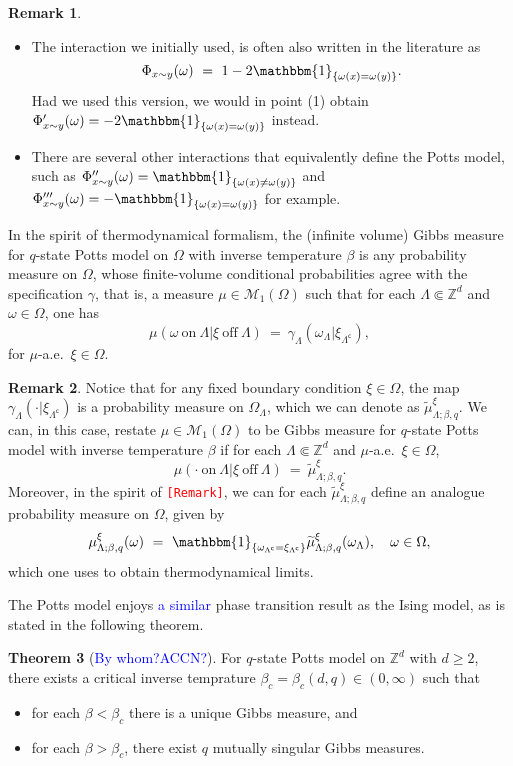 \documentclass[12pt]{article}
\newcommand{\M}{\mathcal{M}}
\newcommand{\Z}{\mathbb{Z}}
\newcommand{\set}[1]{\left\{#1\right\}}
\newcommand{\pika}{\boldsymbol{\cdot}}
\newcommand{\1}{\mathbbm{1}}
\renewcommand{\c}{\mathsf{c}}
\newcommand{\5}{\vspace{0.5cm}}
\renewcommand{\tilde}{\widetilde}
\theoremstyle{definition}
\newtheorem{thm}{Theorem}[section]
\newtheorem{rem}[thm]{Remark}
\begin{document}
\begin{rem}
\begin{itemize}
	\item[(2)] The interaction we initially used, is often also written in the literature as 
	$$\Phi_{x\sim y}(\omega) ~=~ 1-2\1_{\set{\omega(x)=\omega(y)}}.$$
	Had we used this version, we would in point (1) obtain $\Phi_{x\sim y}'(\omega)=-2\1_{\set{\omega(x)=\omega(y)}}$ instead.
	\item[(3)] There are several other interactions that equivalently define the Potts model, such as $\Phi_{x\sim y}''(\omega)=\1_{\set{\omega(x)\neq\omega(y)}}$ and $\Phi_{x\sim y}'''(\omega)=-\1_{\set{\omega(x)=\omega(y)}}$ for example.
\end{itemize}
\end{rem}

In the spirit of thermodynamical formalism, the (infinite volume) Gibbs measure for $q$-state Potts model on $\Omega$ with inverse temperature $\beta$ is any probability measure on $\Omega$, whose finite-volume conditional probabilities agree with the specification $\gamma$, that is, a measure $\mu\in\M_1(\Omega)$ such that for each $\Lambda\Subset\Z^d$ and $\omega\in\Omega$, one has
$$\mu(\omega~\text{on}~\Lambda|\xi~\text{off}~\Lambda) ~=~ \gamma_\Lambda(\omega_\Lambda|\xi_{\Lambda^\c}),$$
for $\mu$-a.e.~$\xi\in\Omega$.

\begin{rem}
Notice that for any fixed boundary condition $\xi\in\Omega$, the map $\gamma_\Lambda(\pika|\xi_{\Lambda^\c})$ is a probability measure on $\Omega_\Lambda$, which we can denote as $\tilde{\mu}_{\Lambda;\beta,q}^\xi$. We can, in this case, restate $\mu\in\M_1(\Omega)$ to be Gibbs measure for $q$-state Potts model with inverse temperature $\beta$ if for each $\Lambda\Subset\Z^d$ and $\mu$-a.e.~$\xi\in\Omega$, 
$$\mu(\pika~\text{on}~\Lambda|\xi~\text{off}~\Lambda) ~=~ \tilde{\mu}_{\Lambda;\beta,q}^\xi.$$
Moreover, in the spirit of \textcolor{red}{\texttt{[Remark]}}, we can for each $\tilde{\mu}_{\Lambda;\beta,q}^\xi$ define an analogue probability measure on $\Omega$, given by
$$\mu_{\Lambda;\beta,q}^\xi(\omega) ~=~ \1_{\set{\omega_{\Lambda^\c}=\xi_{\Lambda^\c}}}\tilde{\mu}_{\Lambda;\beta,q}^\xi(\omega_\Lambda), \quad \omega\in\Omega,$$
which one uses to obtain thermodynamical limits.
\end{rem}

The Potts model enjoys \textcolor{blue}{a similar} phase transition result as the Ising model, as is stated in the following theorem.

\begin{thm}[\textcolor{blue}{By whom?ACCN?}]
For $q$-state Potts model on $\Z^d$ with $d\geq 2$, there exists a critical inverse temprature $\beta_c=\beta_c(d,q)\in(0,\infty)$ such that
\begin{itemize}
	\item[(i)] for each $\beta<\beta_c$ there is a unique Gibbs measure, and 
	\item[(ii)] for each $\beta>\beta_c$, there exist $q$ mutually singular Gibbs measures. 
\end{itemize}
\end{thm}
\end{document}
